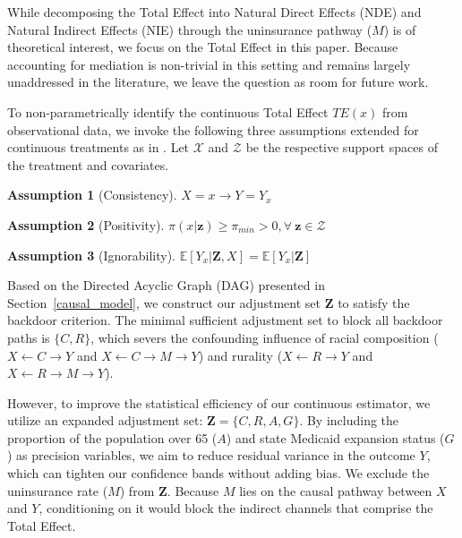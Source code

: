 \documentclass{article}
\theoremstyle{plain}
\theoremstyle{definition}
\newtheorem{assumption}{Assumption}
\theoremstyle{remark}
\begin{document}
While decomposing the Total Effect into Natural Direct Effects (NDE) and 
Natural Indirect Effects (NIE) through the uninsurance pathway ($M$) is of 
theoretical interest, we focus on the Total Effect in this paper. 
Because accounting for mediation is non-trivial in this setting and remains largely unaddressed in the literature, we leave the question as room for future work.

To non-parametrically identify the continuous Total Effect $TE(x)$ from 
observational data, we invoke the following three  assumptions 
extended for continuous treatments as in \citep{kennedy2017non}. Let $\mathcal{X}$ 
and $\mathcal{Z}$ be the respective support spaces of the treatment and 
covariates.
 
\begin{assumption}[Consistency]
$X=x \rightarrow Y = Y_x$
\end{assumption}

\begin{assumption}[Positivity]
$\pi(x|\mathbf z) \geq \pi_{min} > 0,\forall \ \mathbf z \in \mathcal Z$
\end{assumption}

\begin{assumption}[Ignorability]
$\mathbb E[Y_x|\mathbf Z,X] = \mathbb E[Y_x|\mathbf Z]$
\end{assumption}

Based on the Directed Acyclic Graph (DAG) presented in 
Section~\ref{causal_model}, we construct our adjustment set $\mathbf{Z}$ to 
satisfy the backdoor criterion. The minimal sufficient adjustment set 
to block all backdoor paths is $\{C, R\}$, which severs the confounding 
influence of racial composition ($X \leftarrow C \rightarrow Y$ and 
$X \leftarrow C \rightarrow M \rightarrow Y$) and rurality 
($X \leftarrow R \rightarrow Y$ and $X \leftarrow R \rightarrow M \rightarrow Y$).

However, to improve the statistical efficiency of our continuous estimator, 
we utilize an expanded adjustment set: $\mathbf{Z} = \{C, R, A, G\}$. By 
including the proportion of the population over 65 ($A$) and state Medicaid 
expansion status ($G$) as precision variables, we aim to reduce residual variance in the outcome $Y$, which can tighten our confidence bands without 
adding bias. We exclude the uninsurance rate ($M$) 
from $\mathbf{Z}$. Because $M$ lies on the causal pathway between $X$ and 
$Y$, conditioning on it would block the 
indirect channels that comprise the Total Effect.
\end{document}
